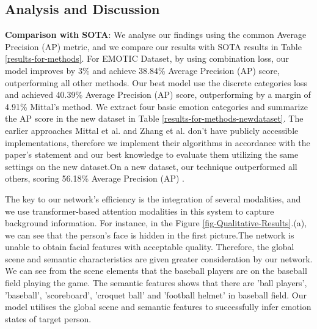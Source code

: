\documentclass[conference]{IEEEtran}
\begin{document}
\subsection{Analysis and Discussion}
\textbf{Comparison with SOTA}:  We analyse our findings using the common Average Precision (AP) metric, and we compare our results with SOTA results in Table \ref{results-for-methods}. For EMOTIC Dataset, by using combination loss, our model improves by 3\% and achieve 38.84\% Average Precision (AP) score, outperforming all other methods. Our best model use the discrete categories loss and achieved 40.39\% Average Precision (AP) score, outperforming by a margin of 4.91\% Mittal's method. We extract four basic emotion categories and summarize the AP score in the new dataset in Table \ref{results-for-methods-newdataset}. The earlier approaches Mittal et al. \cite{ref-21}  and Zhang et al. \cite{ref-42}  don't have publicly accessible implementations, therefore we implement their algorithms in accordance with the paper's statement and our best knowledge to evaluate them utilizing the same settings on the new dataset.On a new dataset, our technique outperformed all others, scoring 56.18\% Average Precision (AP) .


The key to our network's efficiency is the integration of several modalities, and we use transformer-based attention modalities in this system to capture background information. For instance, in the Figure \ref{fig-Qualitative-Results}.(a), we can see that the person's face is hidden in the first picture.The network is unable to obtain facial features with acceptable quality. Therefore, the global scene and semantic characteristics are given greater consideration by our network. We can see from the scene elements that the baseball players are on the baseball field playing the game. The semantic features shows that there are 'ball players', 'baseball', 'scoreboard', 'croquet ball' and 'football helmet' in baseball field. Our model utilises the global scene and semantic features to successfully infer emotion states of target person. 
\end{document}
